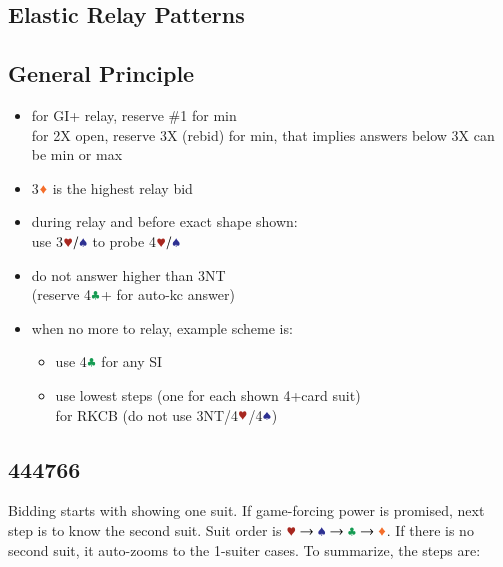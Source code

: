 \documentclass{article}
\newcommand*{\ccc}{\textcolor{ForestGreen}{\clubsuit}}
\newcommand*{\ddd}{\textcolor{Orange}{\vardiamondsuit}}
\newcommand*{\hhh}{\textcolor{Mahogany}{\varheartsuit}}
\newcommand*{\sss}{\textcolor{Blue}{\spadesuit}}
\begin{document}
\begin{multicols}{2}
\section{Elastic Relay Patterns}

\subsection{General Principle}
\begin{itemize}
    \setlength\itemsep{-0.2em}
    \item for GI+ relay, reserve \#1 for min \\
        for 2X open, reserve 3X (rebid) for min,
        that implies answers below 3X can be min or max
    \item 3$\ddd$ is the highest relay bid
    \item during relay and before exact shape shown: \\
        use 3$\hhh/\sss$ to probe 4$\hhh/\sss$
    \item do not answer higher than 3NT \\
        (reserve 4$\ccc$+ for auto-kc answer)
    \item when no more to relay, example scheme is:
    \begin{itemize}
        \setlength\itemsep{-0.2em}
        \item use 4$\ccc$ for any SI
        \item use lowest steps (one for each shown 4+card suit) \\
            for RKCB (do not use 3NT/4$\hhh$/4$\sss$)
    \end{itemize}
\end{itemize}

\subsection{444766}\label{sec:444766}
Bidding starts with showing one suit. If game-forcing power is promised, next step is to know the second suit.
Suit order is $\hhh \rightarrow \sss \rightarrow \ccc \rightarrow \ddd$. If there is no second suit, it auto-zooms to the 1-suiter cases. To summarize, the steps are:


\end{multicols}
\end{document}
